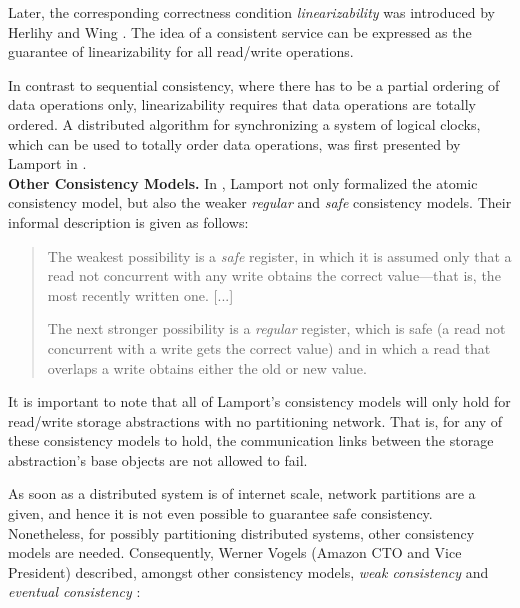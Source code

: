 Later, the corresponding correctness condition \emph{linearizability} was introduced by Herlihy and Wing \cite{HW87} \cite{HW90}. The idea of a consistent service can be expressed as the guarantee of linearizability for all read/write operations. 

In contrast to sequential consistency, where there has to be a partial ordering of data operations only, linearizability requires that data operations are totally ordered. A distributed algorithm for synchronizing a system of logical clocks, which can be used to totally order data operations, was first presented by Lamport in \cite{Lam78}.\\


\noindent
{\bf Other Consistency Models.}
In \cite{Lam86}, Lamport not only formalized the atomic consistency model, but also the weaker \emph{regular} and \emph{safe} consistency models. Their informal description is given as follows:

\begin{quote}
	The weakest possibility is a \emph{safe} register, in which it is assumed only that a read not concurrent with any write obtains the correct value---that is, the most recently written one. [...]

	The next stronger possibility is a \emph{regular} register, which is safe (a read not concurrent with a write gets the correct value) and in which a read that overlaps a write obtains either the old or new value.
\end{quote}

It is important to note that all of Lamport's consistency models will only hold for read/write storage abstractions with no partitioning network. That is, for any of these consistency models to hold, the communication links between the storage abstraction's base objects are not allowed to fail.

As soon as a distributed system is of internet scale, network partitions are a given, and hence it is not even possible to guarantee safe consistency. Nonetheless, for possibly partitioning distributed systems, other consistency models are needed. Consequently, Werner Vogels (Amazon CTO and Vice President) described, amongst other consistency models, \emph{weak consistency} and \emph{eventual consistency} \cite{Vog09}:

